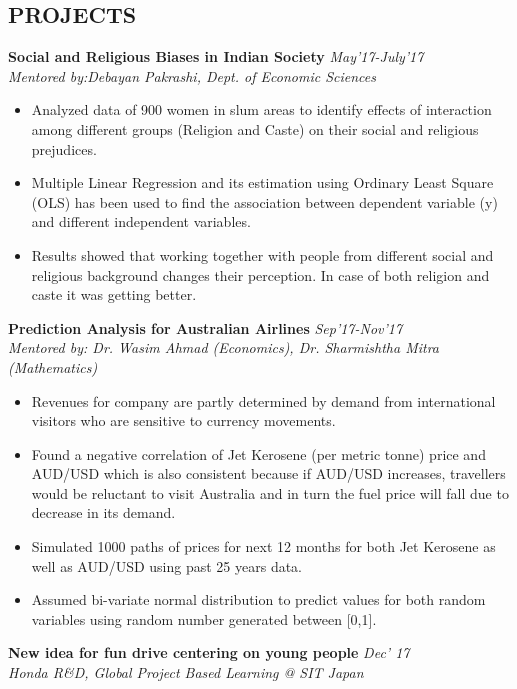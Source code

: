 \documentclass[margin]{res}
\begin{document}
\begin{resume}
\section{PROJECTS}
\textbf{Social and Religious Biases in Indian Society} \hfill \textit{May’17-July’17}\\
\textit{Mentored by:Debayan Pakrashi, Dept. of Economic Sciences}
\begin{itemize}
\item Analyzed data of 900 women in slum areas to identify effects of interaction among different groups (Religion and Caste) on their social and religious prejudices.
\item Multiple Linear Regression and its estimation using Ordinary Least Square (OLS) has been used to find the association between dependent variable (y) and different independent variables.
\item Results showed that working together with people from different social and religious background changes their perception. In case of both religion and caste it was getting better.
\end{itemize}
\textbf{Prediction Analysis for Australian Airlines} \hfill \textit{Sep’17-Nov’17}\\
\textit{Mentored by: Dr. Wasim Ahmad (Economics), Dr. Sharmishtha Mitra (Mathematics)}
\begin{itemize}
\item Revenues for company are partly determined by demand from international visitors who are sensitive to 
currency movements.
\item Found a negative correlation of Jet Kerosene (per metric tonne) price and AUD/USD which is also consistent because if AUD/USD increases, travellers would be reluctant to visit Australia and in turn the fuel price will fall due to decrease in its demand.
\item Simulated 1000 paths of prices for next 12 months for both Jet Kerosene as well as AUD/USD using past 25 years data.
\item Assumed bi-variate normal distribution to predict values for both random variables using random number generated between [0,1].
\end{itemize}
\textbf{New idea for fun drive centering on young people} \hfill \textit{Dec’ 17}\\
\textit{Honda R\&D, Global Project Based Learning @ SIT Japan}
\begin{itemize}

\end{itemize}
\end{resume}
\end{document}
